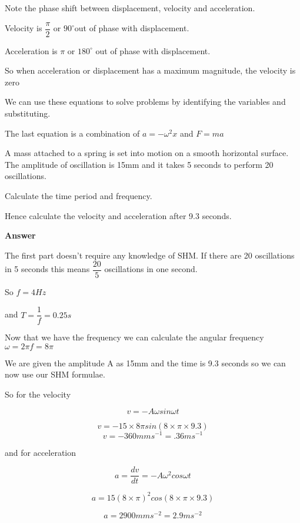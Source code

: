 \documentclass[revision-guide.tex]{subfiles}
\begin{document}
Note the phase shift between displacement, velocity and acceleration.

Velocity is $\dfrac{\pi}{2}$ or $90^\circ$out of phase with displacement.

Acceleration is $\pi$ or $180^\circ$ out of phase with displacement.

So when acceleration or displacement has a maximum magnitude, the velocity is zero



We can use these equations to solve problems by identifying the variables and substituting.

The last equation is a combination of $a = -\omega^2 x$ and $F = ma$

\begin{example}


A mass attached to a spring is set into motion on a smooth horizontal surface. The amplitude of oscillation is 15mm and it takes 5 seconds to perform 20 oscillations.

Calculate the time period and frequency.

Hence calculate the velocity and acceleration after 9.3 seconds.

	\vspace{1cm}
    
\textbf{Answer}

The first part doesn't require any knowledge of SHM. If there are 20 oscillations in 5 seconds this means $\dfrac{20}{5}$ oscillations in one second.

So $f=4Hz$

and $T = \dfrac{1}{f} = 0.25s$

Now that we have the frequency we can calculate the angular frequency $\omega = 2 \pi f = 8 \pi$

We are given the amplitude A as 15mm and the time is 9.3 seconds so we can now use our SHM formulae.

So for the velocity

\[
v=-A \omega sin \omega t 
\]

\[
v = -15 \times 8 \pi sin (8 \times \pi \times 9.3)
\]
\[
v = -360 mms^{-1} = .36ms^{-1}
\]

and for acceleration

\[
a = \dfrac{dv}{dt}= -A \omega^2 cos \omega t
\]

\[
a = 15 (8 \times \pi)^2 cos (8 \times \pi \times 9.3)
\]

\[
a = 2900 mms^{-2} = 2.9ms^{-2}
\]


\end{example}
\end{document}
